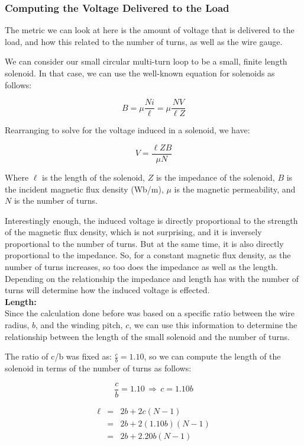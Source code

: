\documentclass[12pt,onecolumn,titlepage]{article}
\begin{document}
\subsubsection{Computing the Voltage Delivered to the Load}
\indent \indent The metric we can look at here is the amount of voltage that is delivered to the load, and how this related to the number of turns, as well as the wire gauge.

We can consider our small circular multi-turn loop to be a small, finite length solenoid. In that case, we can use the well-known equation for solenoids as follows:

\[B = \mu \frac{N i}{\ell} = \mu \frac{N V}{\ell Z} \]

\noindent Rearranging to solve for the voltage induced in a solenoid, we have:

\[ V = \frac{\ell Z B}{\mu N} \]

\noindent Where $\ell$ is the length of the solenoid, $Z$ is the impedance of the solenoid, $B$ is the incident magnetic flux density (Wb/m), $\mu$ is the magnetic permeability, and $N$ is the number of turns.

Interestingly enough, the induced voltage is directly proportional to the strength of the magnetic flux density, which is not surprising, and it is inversely proportional to the number of turns. But at the same time, it is also directly proportional to the impedance. So, for a constant magnetic flux density, as the number of turns increases, so too does the impedance as well as the length. Depending on the relationship the impedance and length has with the number of turns will determine how the induced voltage is effected. \\


{\bf{Length:}} \\
\indent Since the calculation done before  was based on a specific ratio between the wire radius, $b$, and the winding pitch, $c$, we can use this information to determine the relationship between the length of the small solenoid and the number of turns. 

The ratio of c/b was fixed as: $\frac{c}{b} = 1.10$, so we can compute the length of the solenoid in terms of the number of turns as follows:

\[\frac{c}{b} = 1.10 \, \Rightarrow \, c  =1.10b \]

\begin{eqnarray}
\ell &=& 2b + 2c(N-1) \\
&=& 2b + 2(1.10b) (N-1) \\
&=& 2b + 2.20b(N-1)
\end{eqnarray}
\end{document}
